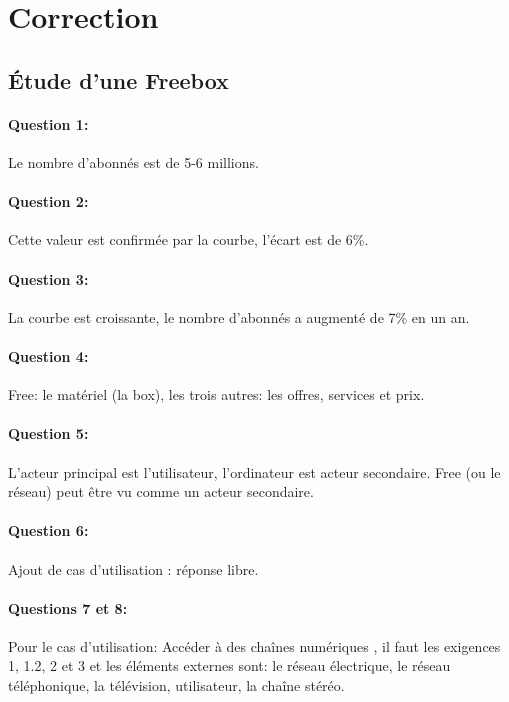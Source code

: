 \clearpage

\ifdef{\public}{}{}

\newpage

\pagestyle{correction}

\section{Correction}

\subsection{Étude d'une Freebox}

\paragraph{Question 1:} Le nombre d'abonnés est de 5-6 millions.

\paragraph{Question 2:} Cette valeur est confirmée par la courbe, l'écart est de 6\%.

\paragraph{Question 3:} La courbe est croissante, le nombre d'abonnés a augmenté de 7\% en un an.

\paragraph{Question 4:} Free: le matériel (la box), les trois autres: les offres, services et prix.

\paragraph{Question 5:} L'acteur principal est l'utilisateur, l'ordinateur est acteur secondaire. Free (ou le réseau) peut être vu comme un acteur secondaire.

\paragraph{Question 6:} Ajout de cas d'utilisation : réponse libre.

\paragraph{Questions 7 et 8:} Pour le cas d'utilisation: \og Accéder à des chaînes numériques \fg, il faut les exigences 1, 1.2, 2 et 3 et les éléments externes sont: le réseau électrique, le réseau téléphonique, la télévision, utilisateur, la chaîne stéréo.


